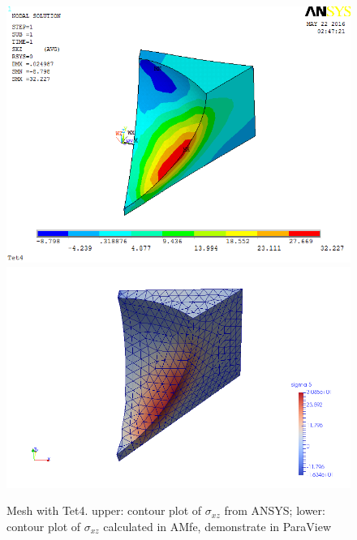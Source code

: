 \begin{figure}[htbp]
	\begin{center}
		\includegraphics[width=13cm,clip]{Tet4Sxz.png} 		
		\includegraphics[width=13cm,clip]{Tet4SxzP.png} 		
		\caption{Mesh with Tet4. upper: contour plot of $\sigma_{xz}$ from ANSYS; lower: contour plot of $\sigma_{xz}$ calculated in AMfe, demonstrate in ParaView} \label{fig: Tet4Sxz}
	\end{center}
\end{figure}
\clearpage 

